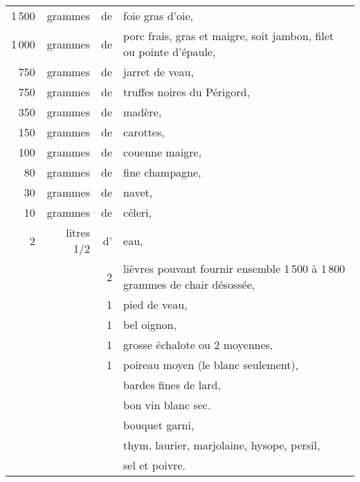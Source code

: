 \footnotesize
\begin{longtable}{rrrp{16em}}
  1 500 & grammes & de & foie gras d'oie,                                                                 \\
  1 000 & grammes & de & porc frais, gras et maigre, soit jambon, filet ou pointe d'épaule,               \\
    750 & grammes & de & jarret de veau,                                                                  \\
    750 & grammes & de & truffes noires du Périgord,                                                      \\
    350 & grammes & de & madère,                                                                          \\
    150 & grammes & de & carottes,                                                                        \\
    100 & grammes & de & couenne maigre,                                                                  \\
     80 & grammes & de & fine champagne,                                                                  \\
     30 & grammes & de & navet,                                                                           \\
     10 & grammes & de & céleri,                                                                          \\
   2 & litres 1/2 & d' & eau,                                                                             \\
        &         & 2 & lièvres pouvant fournir ensemble 1 500 à 1 800 grammes de chair désossée,         \\
        &         & 1 & pied de veau,                                                                     \\
        &         & 1 & bel oignon,                                                                       \\
        &         & 1 & grosse échalote ou 2 moyennes,                                                    \\
        &         & 1 & poireau moyen (le blanc seulement),                                               \\
        &         &   & bardes fines de lard,                                                             \\
        &         &   & bon vin blanc sec.                                                                \\
        &         &   & bouquet garni,                                                                    \\
        &         &   & thym, laurier, marjolaine, hysope, persil,                                        \\
        &         &   & sel et poivre.
\end{longtable}
\normalsize

